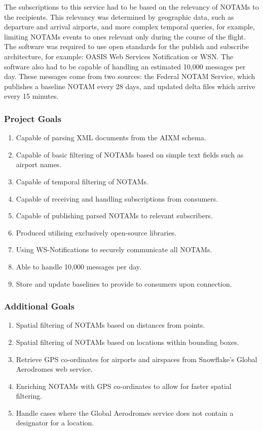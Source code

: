 \documentclass[a4paper, 12pt]{article}
\begin{document}
The subscriptions to this service had to be based on the relevancy of NOTAMs to the recipients. This relevancy was determined by geographic data, such as departure and arrival airports, and more complex temporal queries, for example, limiting NOTAMs events to ones relevant only during the course of the flight. The software was required to use open standards for the publish and subscribe architecture, for example: OASIS Web Services Notification or WSN. The software also had to be capable of handling an estimated 10,000 messages per day. These messages come from two sources: the Federal NOTAM Service, which publishes a baseline NOTAM every 28 days, and updated delta files which arrive every 15 minutes. 

\subsubsection{Project Goals}
\begin{enumerate}
\item Capable of parsing XML documents from the AIXM schema.
\item Capable of basic filtering of NOTAMs based on simple text fields such as airport names.
\item Capable of temporal filtering of NOTAMs.
\item Capable of receiving and handling subscriptions from consumers.
\item Capable of publishing parsed NOTAMs to relevant subscribers.
\item Produced utilising exclusively open-source libraries.
\item Using WS-Notifications to securely communicate all NOTAMs.
\item Able to handle 10,000 messages per day.
\item Store and update baselines to provide to consumers upon connection.
\end{enumerate}

\subsubsection{Additional Goals}
\begin{enumerate}
\item Spatial filtering of NOTAMs based on distances from points.
\item Spatial filtering of NOTAMs based on locations within bounding boxes.
\item Retrieve GPS co-ordinates for airports and airspaces from Snowflake's Global Aerodromes web service.
\item Enriching NOTAMs with GPS co-ordinates to allow for faster spatial filtering.
\item Handle cases where the Global Aerodromes service does not contain a designator for a location.
\end{enumerate}
\end{document}
